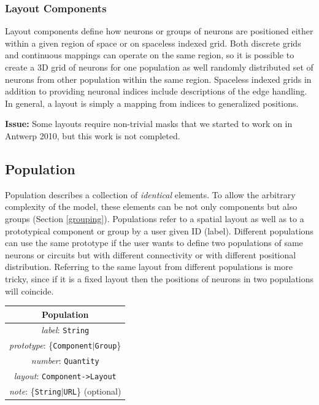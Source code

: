 \documentclass{article}
\newcommand{\issue}[1]{%
\begin{center}
\colorbox{issuecolor}{\parbox{0.8\linewidth}{\textbf{Issue:} #1}}
\end{center}%
}
\begin{document}
\subsubsection{Layout Components}
\label{layout}

Layout components define how neurons or groups of neurons are positioned
either within a given region of space or on spaceless indexed grid. Both
discrete grids and continuous mappings can operate on the same region, so
it is possible to create a 3D grid of neurons for one population as well
randomly distributed set of neurons from other population within the same
region. Spaceless indexed grids in addition to providing neuronal indices
include descriptions of the edge handling. In general, a layout is simply
a mapping from indices to generalized positions.

\issue{Some layouts require non-trivial masks that we started to work on in
Antwerp 2010, but this work is not completed.}

\subsection{Population}

Population describes a collection of \emph{identical} elements. To allow
the arbitrary complexity of the model, these elements can be not only
components but also groups (Section \ref{grouping}). Populations refer to
a spatial layout as well as to a prototypical component or group by a user
given ID (label). Different populations can use the same prototype if the user
wants to define two populations of same neurons or circuits but with
different connectivity or with different positional distribution. Referring
to the same layout from different populations is more tricky, since if it
is a fixed layout then the positions of neurons in two populations will
coincide.

\begin{table}[htb]
\center
\begin{tabular}{|c|}
\hline
\hline
Population \\
\hline
\hline
{\em label}: {\tt String} \\
\hline
{\em prototype}: \{{\tt Component}$|${\tt Group}\}\\
\hline
{\em number}: {\tt Quantity} \\
\hline
{\em layout}: {\tt Component->Layout} \\
\hline
{\em note}: \{{\tt String}$|${\tt URL}\} (optional)\\
\hline
\end{tabular}
\end{table}
\end{document}
